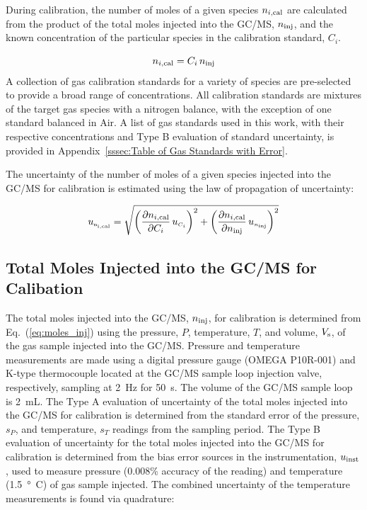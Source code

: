 \documentclass[12pt]{article}
\begin{document}
During calibration, the number of moles of a given species $n_{i,\rm cal}$ are calculated from the product of the total moles injected into the GC/MS, $n_{\rm inj}$, and the known concentration of the particular species in the calibration standard, $C_{i}$.

\begin{equation}
\label{eq:Cal_Moles}
n_{i,\rm cal} = C_{i} \, n_{\rm inj}
\end{equation}
A collection of gas calibration standards for a variety of species are pre-selected to provide a broad range of concentrations. All calibration standards are mixtures of the target gas species with a nitrogen balance, with the exception of one standard balanced in Air. A list of gas standards used in this work, with their respective concentrations and Type B evaluation of standard uncertainty, is provided in Appendix~\ref{sssec:Table of Gas Standards with Error}.

The uncertainty of the number of moles of a given species injected into the GC/MS for calibration is estimated using the law of propagation of uncertainty:

\begin{equation}
\label{eq:Given_Moles_Cal_Uncertainty}
 u_{\rm \scriptscriptstyle n_{i,\rm cal}} = \sqrt{{\left( \frac{\partial n_{i,\rm cal}}{\partial C_{i}}\,u_{\scriptscriptstyle C_{i}} \right)}^2+{\left(\frac{\partial n_{i,\rm cal}}{\partial n_{\rm inj}}\,u_{\scriptscriptstyle n_{\rm inj}}\right)}^2}
\end{equation}

\subsection{Total Moles Injected into the GC/MS for Calibation}
\label{ssec:Total Moles Injected into the GC/MS for Calibation}

The total moles injected into the GC/MS, $ n_{\rm inj}$, for calibration is determined from Eq.~(\ref{eq:moles_inj}) using the pressure, $P$, temperature, $T$, and volume, $V_{\rm s}$, of the gas sample injected into the GC/MS. Pressure and temperature measurements are made using a digital pressure gauge (OMEGA P10R-001) and K-type thermocouple located at the GC/MS sample loop injection valve, respectively, sampling at \SI{2}{Hz} for \SI{50}{s}. The volume of the GC/MS sample loop is 2~mL. The Type A evaluation of uncertainty of the total moles injected into the GC/MS for calibration is determined from the standard error of the pressure, $s_{P}$, and temperature, $s_{T}$ readings from the sampling period. The Type B evaluation of uncertainty for the total moles injected into the GC/MS for calibration is determined from the bias error sources in the instrumentation, $u_{\rm inst}$, used to measure pressure (0.008\% accuracy of the reading) and temperature (\SI{1.5}{\degree C}) of gas sample injected. The combined uncertainty of the temperature measurements is found via quadrature:
\end{document}
